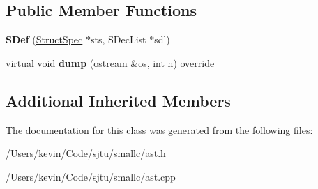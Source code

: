 \subsection*{Public Member Functions}
\begin{DoxyCompactItemize}
\item 
\mbox{\label{class_s_def_a8497380a982313cef1b7c5bc59a28040}} 
{\bfseries S\+Def} (\hyperlink{class_struct_spec}{Struct\+Spec} $\ast$sts, S\+Dec\+List $\ast$sdl)
\item 
\mbox{\label{class_s_def_afc37aa5d57ea94c75c3a08c01cbbc0d7}} 
virtual void {\bfseries dump} (ostream \&os, int n) override
\end{DoxyCompactItemize}
\subsection*{Additional Inherited Members}


The documentation for this class was generated from the following files\+:\begin{DoxyCompactItemize}
\item 
/\+Users/kevin/\+Code/sjtu/smallc/ast.\+h\item 
/\+Users/kevin/\+Code/sjtu/smallc/ast.\+cpp\end{DoxyCompactItemize}
